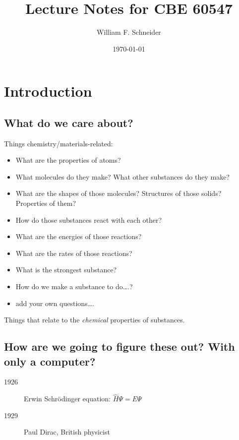 \documentclass[11pt]{article}
\author{William F. Schneider}
\date{\today}
\title{Lecture Notes for CBE 60547}
\begin{document}
\maketitle
\setcounter{tocdepth}{1}
\tableofcontents

\begin{OPTIONS}
\end{OPTIONS}

\section{Introduction}
\label{sec:org0d3acbd}
\subsection{What do we care about?}
\label{sec:org74f291f}

Things chemistry/materials-related:

\begin{itemize}
\item What are the properties of atoms?
\item What molecules do they make?  What other substances do they make?
\item What are the shapes of those molecules?  Structures of those solids?  Properties of them?
\item How do those substances react with each other?
\item What are the energies of those reactions?
\item What are the rates of those reactions?
\item What is the strongest substance?
\item How do we make a substance to do\ldots{}.?
\item add your own questions\ldots{}.
\end{itemize}

Things that relate to the \emph{chemical} properties of substances.

\subsection{How are we going to figure these out?  With only a computer?}
\label{sec:org4796507}
\begin{description}
\item[{1926}] Erwin Schr\"{o}dinger equation: \(\hat{H}\Psi=E\Psi\)
\item[{1929}] Paul Dirac, British physicist
\end{description}
\end{document}
